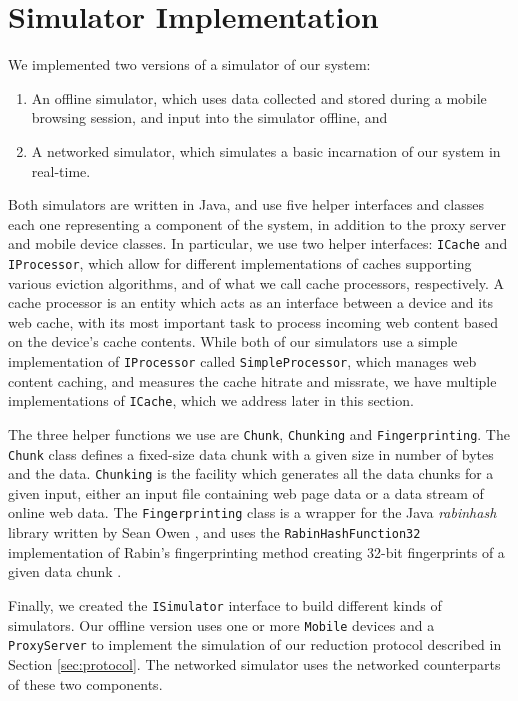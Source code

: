 \section{Simulator Implementation}
\label{sec:implementation}
We implemented two versions of a simulator of our system: 
\begin{enumerate}
\item An offline simulator, which uses data collected and stored during a mobile browsing session, and input into the simulator offline, and
\item A networked simulator, which simulates a basic incarnation of our system in real-time.
\end{enumerate}
Both simulators are written in Java, and use five helper interfaces and classes each one representing a component of the system, in addition to the proxy server and mobile device classes. In particular, we use two helper interfaces: \texttt{ICache} and \texttt{IProcessor}, which allow for different implementations of caches supporting various eviction algorithms, and of what we call cache processors, respectively. A cache processor is an entity which acts as an interface between a device and its web cache, with its most important task to process incoming web content based on the device's cache contents. While both of our simulators use a simple implementation of \texttt{IProcessor} called \texttt{SimpleProcessor}, which manages web content caching, and measures the cache hitrate and missrate, we have multiple implementations of \texttt{ICache}, which we address later in this section. 

The three helper functions we use are \texttt{Chunk}, \texttt{Chunking} and \texttt{Fingerprinting}. The \texttt{Chunk} class defines a fixed-size data chunk with a given size in number of bytes and the data. \texttt{Chunking} is the facility which generates all the data chunks for a given input, either an input file containing web page data or a data stream of online web data. The \texttt{Fingerprinting} class is a wrapper for the Java \emph{rabinhash} library written by Sean Owen \cite{rabinhash}, and uses the \texttt{RabinHashFunction32} implementation of Rabin's fingerprinting method creating 32-bit fingerprints of a given data chunk \cite{rabin_api}.

Finally, we created the \texttt{ISimulator} interface to build different kinds of simulators. Our offline version uses one or more \texttt{Mobile} devices and a \texttt{ProxyServer} to implement the simulation of our reduction protocol described in Section \ref{sec:protocol}. The networked simulator uses the networked counterparts of these two components.

